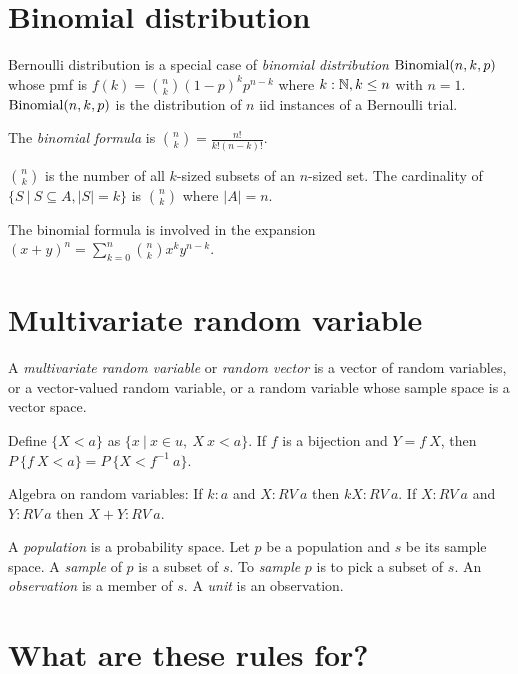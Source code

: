 \section{Binomial distribution}

Bernoulli distribution is a special case of
\emph{binomial distribution} \(\text{Binomial}(n,k,p)\) whose pmf is
\(f(k) = \binom{n}{k} (1-p)^k p^{n-k}\) where \(k : \mathbb{N}, k \le n\) with \(n=1\).
\(\text{Binomial}(n,k,p)\) is the distribution of \(n\) iid instances of a Bernoulli trial.

The \emph{binomial formula} is \(\binom{n}{k} = \frac{n!}{k!(n-k)!}\).

\(\binom{n}{k}\) is the number of all \(k\)-sized subsets of an \(n\)-sized set.
The cardinality of \(\{ S ~|~ S \subseteq A, |S| = k \}\) is \(\binom{n}{k}\)
where \(|A| = n\).

The binomial formula is involved in the expansion \((x+y)^n = \sum_{k=0}^n \binom{n}{k} x^k y^{n-k}\).

\section{Multivariate random variable}

%
%
%
%
%
A \emph{multivariate random variable} or \emph{random vector}
is a vector of random variables,
or a vector-valued random variable,
or a random variable whose sample space is a vector space.

Define \(\{ X < a \}\) as \(\{ x ~|~ x \in u, ~ X~x < a \}\).
If \(f\) is a bijection and \(Y = f~X\),
then \(P~\{f~X < a\} = P~\{X < f^{-1}~a\}\).

Algebra on random variables:
If \(k : a\) and \(X : RV~a\) then \(k X : RV~a\).
If \(X : RV~a\) and \(Y : RV~a\) then \(X+Y : RV~a\).

%
%
%
%
%
%
%
%
A \emph{population} is a probability space.
Let \(p\) be a population and \(s\) be its sample space.
A \emph{sample} of \(p\) is a subset of \(s\).
To \emph{sample} \(p\) is to pick a subset of \(s\).
An \emph{observation} is a member of \(s\).
A \emph{unit} is an observation.

\section{What are these rules for?}

